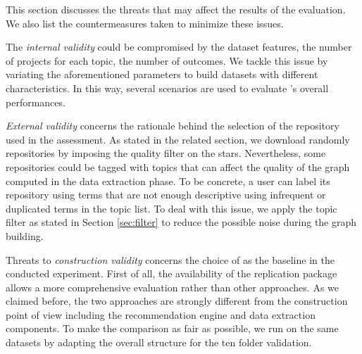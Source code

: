 
This section discusses the threats that may affect the results of the evaluation. We also list the countermeasures taken to minimize these issues.

The \emph{internal validity} could be compromised by the dataset features, \ie the number of projects for each topic, the number of outcomes. We tackle this issue by variating the aforementioned parameters to build datasets with different characteristics. In this way, several scenarios are used to evaluate \TF's overall performances.

\emph{External validity} concerns the rationale behind the selection of the \GH repository used in the assessment. As stated in the related section, we download randomly repositories by imposing the quality filter on the stars. Nevertheless, some repositories could be tagged with topics that can affect the quality of the graph computed in the data extraction phase. To be concrete, a user can label its repository using terms that are not enough descriptive \ie using infrequent or duplicated terms in the topic list. To deal with this issue, we apply the topic filter as stated in Section \ref{sec:filter} to reduce the possible noise during the graph building.

Threats to \emph{construction validity} concerns the choice of \MNB as the baseline in the conducted experiment. First of all, the availability of the replication package allows a more comprehensive evaluation rather than other approaches. As we claimed before, the two approaches are strongly different from the construction point of view including the recommendation engine and data extraction components. To make the comparison as fair as possible, we run \MNB on the same datasets by adapting the overall structure for the ten folder validation.